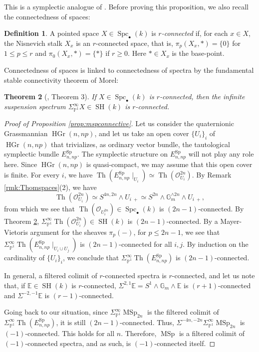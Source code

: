 \documentclass[10pt]{amsart}
\theoremstyle{definition}
\newtheorem{defn}{Definition}[section]
\theoremstyle{plain}
\newtheorem{thm}[defn]{Theorem}
\numberwithin{equation}{section}
\newcommand{\0}{\emptyset}
\newcommand{\E}{{\mathbb E}}
\newcommand{\G}{{\mathbb G}}
\renewcommand{\P}{{\mathbb P}}
\newcommand{\MSp}{{\operatorname{MSp}}}
\newcommand{\Sp}{{\operatorname{Sp}}}
\newcommand{\HGr}{{\operatorname{HGr}}}
\newcommand{\SH}{{\operatorname{SH}}}
\newcommand{\Th}{{\operatorname{Th}}}
\newcommand{\Spc}{{\operatorname{Spc}}}
\begin{document}
This is a symplectic analogue of \cite[Corollary 2.3]{lev:ellcoh}. Before proving this proposition, we also recall the connectedness of spaces:

\begin{defn}
    A pointed space $X \in \Spc_{\bullet}(k)$ is \emph{$r$-connected} if, for each $x \in X$, the Nisnevich stalk $X_x$ is an $r$-connected space, that is, $\pi_p(X_x,*)=\{0\}$ for $1\le p\le r$ and $\pi_0(X_x,*)=\{*\}$ if $r\ge0$. Here $*\in X_x$ is the base-point.
\end{defn}

Connectedness of spaces is linked to connectedness of spectra by the fundamental stable connectivity theorem of Morel:

\begin{thm}[\cite{Morel:connectivity}, Theorem 3]
\label{thm:MorelConnectivity}
    If $X \in \Spc_{\bullet}(k)$ is $r$-connected, then the infinite suspension spectrum $\Sigma_{\P^1}^\infty X \in \SH(k)$ is $r$-connected.
\end{thm}

\begin{proof}[Proof of Proposition \ref{prop:mspconnective}]
    Let us consider the quaternionic Grassmannian $\HGr(n,np)$, and let us take an open cover $\{U_i\}_i$ of $\HGr(n,np)$ that trivializes, as ordinary vector bundle, the tautological symplectic bundle $E_{n,np}^\Sp$. The symplectic structure on $E_{n,np}^\Sp$ will not play any role here. Since $\HGr(n,np)$ is quasi-compact, we may assume that this open cover is finite. For every $i$, we have $\Th(E_{n,np}^\Sp \mid_{U_i})\simeq \Th(\mathcal{O}_{U_i}^{2n})$. By Remark \ref{rmk:Thomspaces}(2), we have
    $$\Th(\mathcal{O}_{U_i}^{2n}) \simeq S^{4n,2n}\wedge U_{i\; +} \simeq S^{2n} \wedge \G_m^{\wedge 2n} \wedge U_{i \; +},$$
    from which we see that $\Th(\mathcal{O}_{U_i^{2n}}) \in \Spc_{\bullet}(k)$ is $(2n-1)$-connected. By Theorem \ref{thm:MorelConnectivity}, $\Sigma_{\P^1}^\infty \Th(\mathcal{O}_{U_i}^{2n}) \in \SH(k)$ is $(2n-1)$-connected. By a Mayer-Vietoris argument for the sheaves $\pi_p(-)$, for $p\le 2n-1$, we see that $\Sigma_{\P^1}^\infty \Th(E_{n,np}^\Sp \mid_{U_i \cup U_j})$ is $(2n-1)$-connected for all $i,j$. By induction on the cardinality of $\{U_i\}_i$, we conclude that $\Sigma_{\P^1}^\infty \Th(E_{n,np}^\Sp)$ is $(2n-1)$-connected. 

    In general, a filtered colimit of $r$-connected spectra is $r$-connected, and let us note that, if $\E \in \SH(k)$ is $r$-connected, $\Sigma^{2,1}\E=S^1 \wedge \G_m \wedge \E$ is $(r+1)$-connected and $\Sigma^{-2,-1}\E$ is $(r-1)$-connected.

    Going back to our situation, since $\Sigma_{\P^1}^\infty \MSp_{2n}$ is the filtered colimit of $\Sigma_{\P^1}^\infty \Th(E^\Sp_{n,np})$, it is still $(2n-1)$-connected. Thus, $\Sigma^{-4n,-2n}\Sigma_{\P^1}^\infty \MSp_{2n}$ is $(-1)$-connected. This holds for all $n$. Therefore, $\MSp$ is a filtered colimit of $(-1)$-connected spectra, and as such, is $(-1)$-connected itself.
\end{proof}
\end{document}
